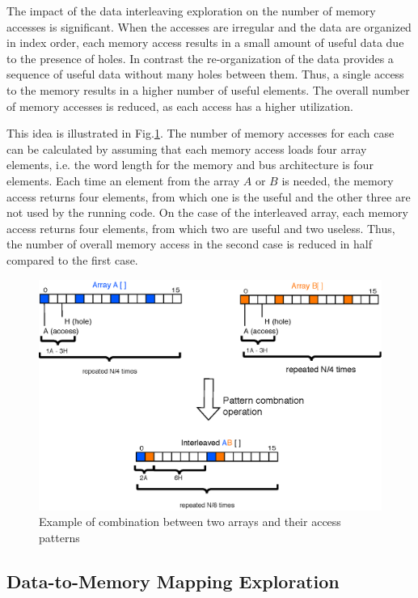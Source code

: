 \documentclass[prodmode,acmtodaes]{acmsmall}
\begin{document}
The impact of the data interleaving exploration on the number of memory accesses is significant.
When the accesses are irregular and the data are organized in index order, each memory access results in a small amount of useful data due to the presence of holes.
In contrast the re-organization of the data provides a sequence of useful data without many holes between them.
Thus, a single access to the memory results in a higher number of useful elements.
The overall number of memory accesses is reduced, as each access has a higher utilization.

This idea is illustrated in Fig.\ref{fig:algebra}.
The number of memory accesses for each case can be calculated by assuming that each memory access loads four array elements, i.e. the word length for the memory and bus architecture is four elements.
Each time an element from the array $A$ or $B$ is needed, the memory access returns four elements, from which one is the useful and the other three are not used by the running code.
On the case of the interleaved array, each memory access returns four elements, from which two are useful and two useless.
Thus, the number of overall memory access in the second case is reduced in half compared to the first case.

\begin{figure}
\centering
	\caption{Example of combination between two arrays and their access patterns}
	\label{fig:algebra}
	\includegraphics[scale = 0.5]{Images/Algebra.eps} 
\end{figure}

\subsection{Data-to-Memory Mapping Exploration}
\end{document}
